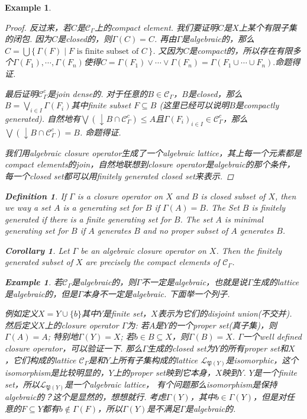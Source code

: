 \documentclass{article}
\newtheorem{corollary}[theorem]{Corollary}
\newtheorem{example}[theorem]{Example}
\newtheorem{definition}[theorem]{Definition}
\newcommand\Set[2]{\{\,#1\mid#2\,\}} %
\newcommand\SET[2]{\Set{#1}{\text{#2}}} %
\newcommand\lattice{\mathcal{L}}
\begin{document}
\begin{example}
\begin{proof}
反过来，若$C$是$\mathcal{C}_{\Gamma}$上的compact element. {\color{red}我们要证明$C$是$X$上某个有限子集的闭包}. 因为$C$是closed的，则$\Gamma(C) = C$. 再由$\Gamma$是algebraic的，那么$C = \bigcup\SET{\Gamma(F)}{$F$ is finite subset of $C$}$. 又因为$C$是compact的，所以存在有限多个$\Gamma(F_1),\cdots,\Gamma(F_n)$使得$C = \Gamma(F_1) \vee \cdots \vee \Gamma(F_n) = \Gamma(F_1 \cup \cdots \cup F_n).$命题得证.

{\color{red} 最后证明$\mathcal{C}_{\Gamma}^c$是join dense的}. 对于任意的$B \in \mathcal{C}_{\Gamma}$，$B$是closed，那么$B = \bigvee\limits_{i \in I} \Gamma(F_i)$其中finite subset $F \subseteq B$ (这里已经可以说明$B$是compactly generated).  自然地有$\bigvee(\downarrow B \cap \mathcal{C}_{\Gamma}^c) \leq A$且$\Gamma(F_i)_{i \in I} \in \mathcal{C}_{\Gamma}^c$，那么$\bigvee(\downarrow B \cap \mathcal{C}_{\Gamma}^c) = B$. 命题得证.

\color{blue} 我们用algebraic closure operator生成了一个algebraic lattice，其上每一个元素都是compact elements的join，自然地联想到closure operator是algebraic的那个条件，每一个closed set都可以用finitely generated closed set来表示.
\end{proof}


\begin{definition}
\rm If $\Gamma$ is a closure operator on $X$ and $B$ is closed subset of $X$, then we way a set $A$ is a {\color{red} generating set} for $B$ if $\Gamma(A) = B$. The Set $B$ is {\color{red} finitely generated} if there is a finite generating set for $B$.  The set $A$ is {\color{red} minimal generating set} for $B$ if $A$ generates $B$ and no proper subset of $A$ generates $B$.
\end{definition}

\begin{corollary}
\rm Let $\Gamma$ be an algebraic closure operator on $X$. Then the finitely generated subset of $X$  are precisely the compact elements of $\mathcal{C}_{\Gamma}$.
\end{corollary}

\begin{example}
\rm 若$\mathcal{C}_{\Gamma}$是algebraic的，则$\Gamma$不一定是algebraic，也就是说$\Gamma$生成的lattice 是algebraic的，但是$\Gamma$本身不一定是algebraic. 下面举一个列子.

例如定义$X = Y \cup \{b\}$其中$Y$是finite set，$X$表示为它们的disjoint union(不交并). 然后定义$X$上的closure operator $\Gamma$为: 若$A$是$Y$的一个proper set(真子集)，则$\Gamma(A) = A$; 特别地$\Gamma(Y) = X$; 若$b \in B \subseteq X$，则$\Gamma(B) = X$. $\Gamma$一个well defined closure operator，可以验证一下. 那么$\Gamma$生成的closed set为$Y$的所有proper set和$X$，它们构成的lattice $\mathcal{C}_{\Gamma}$是和$Y$上所有子集构成的lattice $\lattice_{\mathfrak{P}(Y)}$是isomorphic，这个isomorphism是比较明显的，$Y$上的proper set映到它本身，$X$映到$Y$.  $Y$是一个finite set，所以$\lattice_{\mathfrak{P}(Y)}$是一个algebraic lattice，{\color{red} 有个问题那么isomorphism是保持algebraic的？这个是显然的}，想想就行. 考虑$\Gamma(Y)$，其中$b \in \Gamma(Y)$，但是对任意的$F \subseteq Y$都有$b \notin \Gamma(F)$，所以$\Gamma(Y)$是不满足$\Gamma$是algebraic的.
\end{example} 


\end{example}
\end{document}
